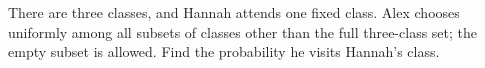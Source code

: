 There are three classes, and Hannah attends one fixed class. Alex chooses uniformly among all subsets of classes other than the full three-class set; the empty subset is allowed. Find the probability he visits Hannah's class.
